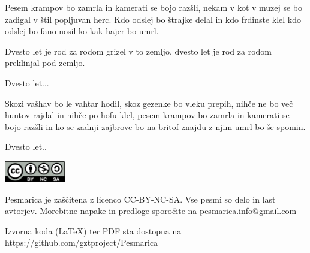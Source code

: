 \documentclass[a4paper,12pt]{article}
\begin{document}
\begin{multicols}{2}
\begin{guitar}
Pesem krampov bo zamrla
in kamerati se bojo razšli,
nekam v kot v muzej se bo zadigal
v štil popljuvan herc.
Kdo odslej bo štrajke delal
in kdo frdinste klel
kdo odslej bo fano nosil
ko kak hajer bo umrl.


Dvesto let je rod za rodom grizel v to zemljo,
dvesto let je rod za rodom 
preklinjal pod zemljo.


Dvesto let...


Skozi vašhav bo le vahtar hodil,
skoz gezenke bo vleku prepih,
nihče ne bo več huntov rajdal
in nihče po hofu klel,
pesem krampov bo zamrla
in kamerati se bojo razšli
in ko se zadnji zajbrovc bo na britof znajdu
z njim umrl bo še spomin.


Dvesto let..
\end{guitar}
\end{multicols}
\clearpage
\clearpage
\null
\vfill
\center
\includegraphics[width=100px]{img/licence.png}

Pesmarica je zaščitena z licenco CC-BY-NC-SA. Vse pesmi so delo in last avtorjev. Morebitne napake in predloge sporočite na pesmarica.info@gmail.com 

Izvorna koda (LaTeX) ter PDF sta dostopna na https://github.com/gztproject/Pesmarica
\end{document}
